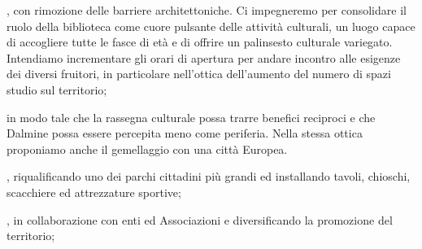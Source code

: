 , con rimozione delle barriere architettoniche. Ci impegneremo per consolidare il ruolo della biblioteca come cuore pulsante delle attività culturali, un luogo capace di accogliere tutte le fasce di età e di offrire un palinsesto culturale variegato. Intendiamo incrementare gli orari di apertura per andare incontro alle esigenze dei diversi fruitori, in particolare nell'ottica dell'aumento del numero di spazi studio sul territorio;

 in modo tale che la rassegna culturale possa trarre benefici reciproci e che Dalmine possa essere percepita meno come periferia. Nella stessa ottica proponiamo anche il gemellaggio con una città Europea.

, riqualificando uno dei parchi cittadini più grandi ed installando tavoli, chioschi, scacchiere ed attrezzature sportive;

, in collaborazione con enti ed Associazioni e diversificando la promozione del territorio;
